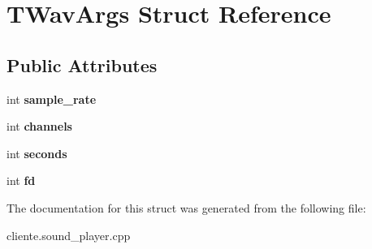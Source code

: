 \hypertarget{structTWavArgs}{\section{T\-Wav\-Args Struct Reference}
\label{structTWavArgs}
}
\subsection*{Public Attributes}
\begin{DoxyCompactItemize}
\item 
\hypertarget{structTWavArgs_a531620488d50622828137833592ab8d9}{int {\bfseries sample\-\_\-rate}}\label{structTWavArgs_a531620488d50622828137833592ab8d9}

\item 
\hypertarget{structTWavArgs_a84d83e5cdbd062fb51849f07cdb08fbb}{int {\bfseries channels}}\label{structTWavArgs_a84d83e5cdbd062fb51849f07cdb08fbb}

\item 
\hypertarget{structTWavArgs_a8cd4a5f5b1a07dd824aaf8cf42e775db}{int {\bfseries seconds}}\label{structTWavArgs_a8cd4a5f5b1a07dd824aaf8cf42e775db}

\item 
\hypertarget{structTWavArgs_a770ba7334153112aa7fd588b3597765e}{int {\bfseries fd}}\label{structTWavArgs_a770ba7334153112aa7fd588b3597765e}

\end{DoxyCompactItemize}


The documentation for this struct was generated from the following file\-:\begin{DoxyCompactItemize}
\item 
cliente.\-sound\-\_\-player.\-cpp\end{DoxyCompactItemize}
